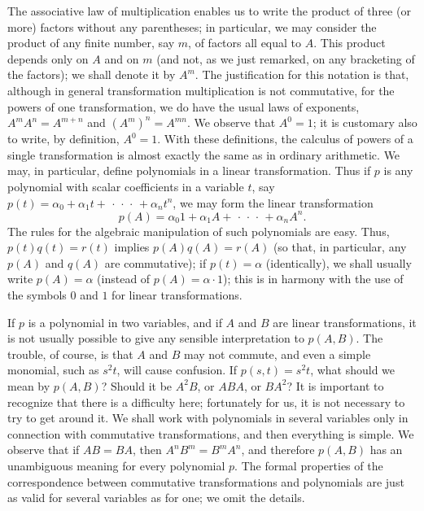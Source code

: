 The associative law of multiplication enables us to write the product of three
(or more) factors without any parentheses; in particular, we may consider the
product of any finite number, say \(m\), of factors all equal to \(A\). This
product depends only on \(A\) and on \(m\) (and not, as we just remarked, on any
bracketing of the factors); we shall denote it by \(A^m\). The justification for
this notation is that, although in general transformation multiplication is not
commutative, for the powers of one transformation, we do have the usual laws of
exponents, \(A^m A^n = A^{m+n}\) and \((A^m)^n = A^{mn}\). We observe that \(A^0
= 1\); it is customary also to write, by definition, \(A^0 = 1\). With these
definitions, the calculus of powers of a single transformation is almost exactly
the same as in ordinary arithmetic. We may, in particular, define polynomials in
a linear transformation. Thus if \(p\) is any polynomial with scalar
coefficients in a variable \(t\), say \(p(t) = \alpha_0 + \alpha_1 t +
\,\cdot\,\cdot\,\cdot\, + \alpha_n t^n\), we may form the linear transformation
\begin{equation*}
    p(A) = \alpha_0 1 + \alpha_1 A + \,\cdot\,\cdot\,\cdot\, + \alpha_n A^n.
\end{equation*}
The rules for the algebraic manipulation of such polynomials are easy. Thus,
\(p(t) q(t) = r(t)\) implies \(p(A) q(A) = r(A)\) (so that, in particular, any
\(p(A)\) and \(q(A)\) are commutative); if \(p(t) = \alpha\) (identically), we
shall usually write \(p(A) = \alpha\) (instead of \(p(A) = \alpha \cdot 1\));
this is in harmony with the use of the symbols \(0\) and \(1\) for linear
transformations.

If \(p\) is a polynomial in two variables, and if \(A\) and \(B\) are linear
transformations, it is not usually possible to give any sensible interpretation
to \(p(A,B)\). The trouble, of course, is that \(A\) and \(B\) may not commute,
and even a simple monomial, such as \(s^2 t\), will cause confusion. If \(p(s,t)
= s^2 t\), what should we mean by \(p(A,B)\)? Should it be \(A^2B\), or \(ABA\),
or \(BA^2\)? It is important to recognize that there is a difficulty here;
fortunately for us, it is not necessary to try to get around it. We shall work
with polynomials in several variables only in connection with commutative
transformations, and then everything is simple. We observe that if \(AB = BA\),
then \(A^nB^m = B^mA^n\), and therefore \(p(A,B)\) has an unambiguous meaning
for every polynomial \(p\). The formal properties of the correspondence between
commutative transformations and polynomials are just as valid for several
variables as for one; we omit the details.


